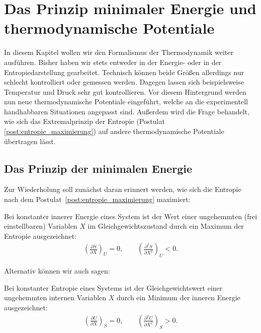 

\chapter{Das Prinzip minimaler Energie und thermodynamische Potentiale}

In diesem Kapitel wollen wir den Formalismus der Thermodynamik weiter ausführen.
Bisher haben wir stets entweder in der Energie- oder in der Entropiedarstellung gearbeitet. Technisch können beide Größen allerdings nur schlecht kontrolliert oder gemessen werden. Dagegen lassen sich beispielsweise Temperatur und Druck sehr gut kontrollieren. Vor diesem Hintergrund werden nun neue thermodynamische Potentiale eingeführt, welche an die experimentell handhabbaren Situationen angepasst sind.
Außerdem wird die Frage behandelt, wie sich das Extremalprinzip der Entropie (Postulat \ref{post:entropie_maximierung}) auf andere thermodynamische Potentiale übertragen lässt.


\section{Das Prinzip der minimalen Energie}

Zur Wiederholung soll zunächst daran erinnert werden, wie sich die Entropie nach dem Postulat~\ref{post:entropie_maximierung} maximiert:
\begin{formal}
    Bei konstanter innerer Energie eines System ist der Wert einer ungehemmten (frei einstellbaren) Variablen $X$ im Gleichgewichtszustand durch ein Maximum der Entropie ausgezeichnet:
    \begin{align}
        \label{eq:Entropiemaximum}
        \left( \frac{\partial S}{\partial X}  \right)_U = 0, \qquad \left( \frac{\partial ^2S}{\partial X^2}  \right)_U < 0.
    \end{align}
\end{formal}

Alternativ können wir auch sagen:

\begin{formal}
    Bei konstanter Entropie eines Systems ist der Gleichgewichtswert einer ungehemmten internen Variablen $X$ durch ein Minimum der inneren Energie ausgezeichnet:
    \begin{align*}
        \left( \frac{\partial U}{\partial X}  \right)_S = 0, \qquad \left( \frac{\partial ^2U}{\partial X^2}  \right)_S > 0.
    \end{align*}
\end{formal}

